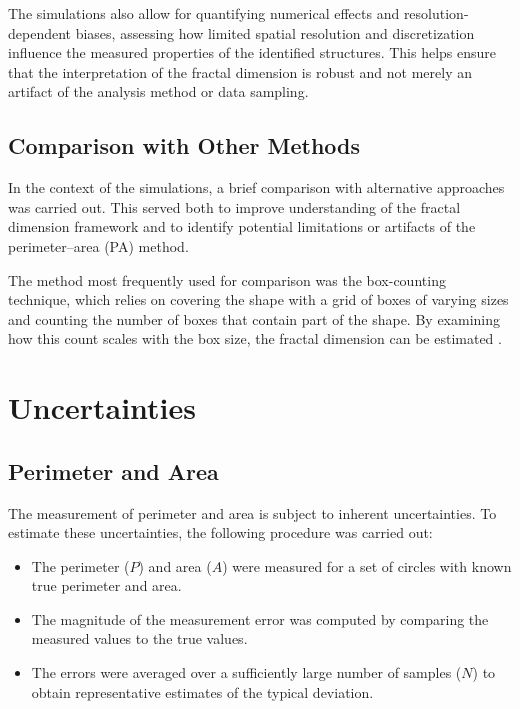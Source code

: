 The simulations also allow for quantifying numerical effects and resolution-dependent biases, assessing how limited spatial resolution and discretization influence the measured properties of the identified structures. This helps ensure that the interpretation of the fractal dimension is robust and not merely an artifact of the analysis method or data sampling.

\subsection{Comparison with Other Methods}

In the context of the simulations, a brief comparison with alternative approaches was carried out. This served both to improve understanding of the fractal dimension framework and to identify potential limitations or artifacts of the perimeter–area (PA) method.

The method most frequently used for comparison was the box-counting technique, which relies on covering the shape with a grid of boxes of varying sizes and counting the number of boxes that contain part of the shape. By examining how this count scales with the box size, the fractal dimension can be estimated \cite{falconer2013fractal}. 

\section{Uncertainties}

\subsection{Perimeter and Area}

The measurement of perimeter and area is subject to inherent uncertainties. To estimate these uncertainties, the following procedure was carried out:

\begin{itemize}
    \item The perimeter ($P$) and area ($A$) were measured for a set of circles with known true perimeter and area.
    \item The magnitude of the measurement error was computed by comparing the measured values to the true values.
    \item The errors were averaged over a sufficiently large number of samples ($N$) to obtain representative estimates of the typical deviation.
\end{itemize}

